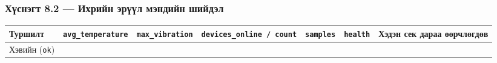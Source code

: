 \hypertarget{ux445ux4afux441ux43dux44dux433ux442-8.2-ux438ux445ux440ux438ux439ux43d-ux44dux440ux4afux4afux43b-ux43cux44dux43dux434ux438ux439ux43d-ux448ux438ux439ux434ux44dux43b}{%
\subsubsection{Хүснэгт 8.2 --- Ихрийн эрүүл мэндийн шийдэл}\label{ux445ux4afux441ux43dux44dux433ux442-8.2-ux438ux445ux440ux438ux439ux43d-ux44dux440ux4afux4afux43b-ux43cux44dux43dux434ux438ux439ux43d-ux448ux438ux439ux434ux44dux43b}}

\begingroup\scriptsize\begin{longtable}[]{@{}lllllll@{}}
\toprule
\begin{minipage}[b]{0.12\columnwidth}\raggedright
Туршилт\strut
\end{minipage} & \begin{minipage}[b]{0.12\columnwidth}\raggedright
\texttt{avg\_temperature}\strut
\end{minipage} & \begin{minipage}[b]{0.12\columnwidth}\raggedright
\texttt{max\_vibration}\strut
\end{minipage} & \begin{minipage}[b]{0.12\columnwidth}\raggedright
\texttt{devices\_\allowbreak{}online\ /\allowbreak{}\ count}\strut
\end{minipage} & \begin{minipage}[b]{0.12\columnwidth}\raggedright
\texttt{samples}\strut
\end{minipage} & \begin{minipage}[b]{0.12\columnwidth}\raggedright
\texttt{health}\strut
\end{minipage} & \begin{minipage}[b]{0.12\columnwidth}\raggedright
Хэдэн сек дараа өөрчлөгдөв\strut
\end{minipage}\tabularnewline
\midrule
\endhead
\begin{minipage}[t]{0.12\columnwidth}\raggedright
Хэвийн (\texttt{ok})\strut
\end{minipage} & \begin{minipage}[t]{0.12\columnwidth}\raggedright
\strut
\end{minipage} & \begin{minipage}[t]{0.12\columnwidth}\raggedright
\strut
\end{minipage} & \begin{minipage}[t]{0.12\columnwidth}\raggedright
\strut
\end{minipage} & \begin{minipage}[t]{0.12\columnwidth}\raggedright

\end{minipage}
\end{longtable}
